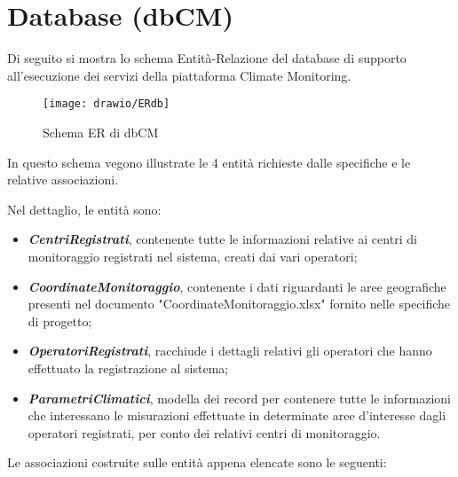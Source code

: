 \chapter{Database (dbCM)}
Di seguito si mostra lo schema Entità-Relazione del database di supporto all’esecuzione dei servizi della piattaforma Climate Monitoring.

\begin{figure}[h]
	\centering
	\texttt{[image: drawio/ERdb]}
	\caption{Schema ER di dbCM}
	\label{fig:erdb}
\end{figure}

In questo schema vegono illustrate le 4 entità richieste dalle specifiche e le relative associazioni.

Nel dettaglio, le entità sono:
\begin{itemize}
	\item \textbf{\textit{CentriRegistrati}}, contenente tutte le informazioni relative ai centri di monitoraggio registrati nel sistema, creati dai vari operatori;
	\item \textbf{\textit{CoordinateMonitoraggio}}, contenente i dati riguardanti le aree geografiche presenti nel documento "CoordinateMonitoraggio.xlsx" fornito nelle specifiche di progetto;
	\item \textbf{\textit{OperatoriRegistrati}}, racchiude i dettagli relativi gli operatori che hanno effettuato la registrazione al sistema;
	\item \textbf{\textit{ParametriClimatici}}, modella dei record per contenere tutte le informazioni che interessano le misurazioni effettuate in determinate aree d'interesse dagli operatori registrati, per conto dei relativi centri di monitoraggio.
\end{itemize}
\pagebreak
Le associazioni costruite sulle entità appena elencate sono le seguenti:
